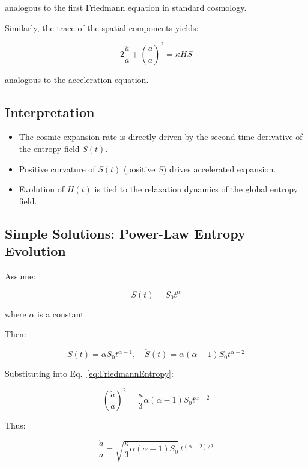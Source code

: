 \documentclass{article}
\begin{document}
analogous to the first Friedmann equation in standard cosmology.

Similarly, the trace of the spatial components yields:

\begin{equation}
2\frac{\ddot{a}}{a} + \left( \frac{\dot{a}}{a} \right)^2 = \kappa H \dot{S}
\label{eq:AccelerationEntropy}
\end{equation}

analogous to the acceleration equation.

\subsection{Interpretation}
\begin{itemize}
\item The cosmic expansion rate is directly driven by the second time derivative of the entropy field $S(t)$.
\item Positive curvature of $S(t)$ (positive $\ddot{S}$) drives accelerated expansion.
\item Evolution of $H(t)$ is tied to the relaxation dynamics of the global entropy field.
\end{itemize}

\subsection{Simple Solutions: Power-Law Entropy Evolution}

Assume:

\begin{equation}
S(t) = S_0 t^\alpha
\end{equation}

where $\alpha$ is a constant.

Then:

\[
\dot{S}(t) = \alpha S_0 t^{\alpha-1}, \quad \ddot{S}(t) = \alpha(\alpha-1) S_0 t^{\alpha-2}
\]

Substituting into Eq.~\eqref{eq:FriedmannEntropy}:

\begin{equation}
\left( \frac{\dot{a}}{a} \right)^2 = \frac{\kappa}{3} \alpha(\alpha-1) S_0 t^{\alpha-2}
\end{equation}

Thus:

\begin{equation}
\frac{\dot{a}}{a} = \sqrt{ \frac{\kappa}{3} \alpha(\alpha-1) S_0 } \, t^{(\alpha-2)/2}
\end{equation}
\end{document}

